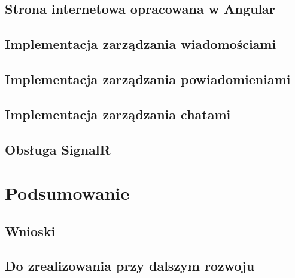 \documentclass[12pt,a4paper]{article}
\begin{document}
\subsection{Strona internetowa opracowana w Angular}
\subsection{Implementacja zarządzania wiadomościami}
\subsection{Implementacja zarządzania powiadomieniami}
\subsection{Implementacja zarządzania chatami}
\subsection{Obsługa SignalR}

\section{Podsumowanie}

\subsection{Wnioski}
\subsection{Do zrealizowania przy dalszym rozwoju}
\end{document}
